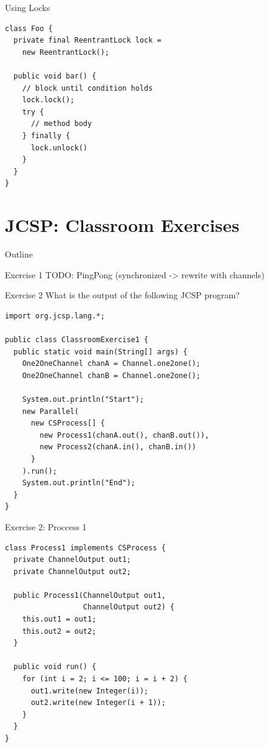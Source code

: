 \begin{frame}[fragile]{Using Locks}
  \begin{lstlisting}
class Foo {
  private final ReentrantLock lock = 
    new ReentrantLock();

  public void bar() {
    // block until condition holds
    lock.lock();
    try {
      // method body
    } finally {
      lock.unlock()
    }
  }
}
\end{lstlisting}
\end{frame}


\section{JCSP: Classroom Exercises}

\begin{frame}{Outline}
  \tableofcontents[current]
\end{frame}

\begin{frame}[fragile]{Exercise 1}
  TODO: PingPong (synchronized -> rewrite with channels)
\end{frame}

\begin{frame}[fragile]{Exercise 2}
  What is the output of the following JCSP program?


\begin{lstlisting}[basicstyle=\fontsize{9}{11}\selectfont\ttfamily]
import org.jcsp.lang.*;

public class ClassroomExercise1 {
  public static void main(String[] args) {
    One2OneChannel chanA = Channel.one2one();
    One2OneChannel chanB = Channel.one2one();

    System.out.println("Start");
    new Parallel(
      new CSProcess[] { 
        new Process1(chanA.out(), chanB.out()),
        new Process2(chanA.in(), chanB.in()) 
      }
    ).run();
    System.out.println("End");
  }
}
\end{lstlisting}
\end{frame}

\begin{frame}[fragile]{Exercise 2: Proccess 1}
\begin{lstlisting}[basicstyle=\fontsize{9}{11}\selectfont\ttfamily]
class Process1 implements CSProcess {
  private ChannelOutput out1;
  private ChannelOutput out2;

  public Process1(ChannelOutput out1, 
                  ChannelOutput out2) {
    this.out1 = out1;
    this.out2 = out2;
  }

  public void run() {
    for (int i = 2; i <= 100; i = i + 2) {
      out1.write(new Integer(i));
      out2.write(new Integer(i + 1));
    }
  }
}
\end{lstlisting}
\end{frame}

